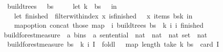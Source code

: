 \begin{isabellebody}
\ \ {\isachardoublequoteopen}build{\isacharunderscore}{\kern0pt}trees\ {\isasymG}\ {\isasymomega}\ bs\ {\isasymequiv}\isanewline
\ \ \ \ let\ k\ {\isacharequal}{\kern0pt}\ {\isacharbar}{\kern0pt}bs{\isacharbar}{\kern0pt}\ {\isacharminus}{\kern0pt}\ {}\ in\isanewline
\ \ \ \ let\ finished\ {\isacharequal}{\kern0pt}\ filter{\isacharunderscore}{\kern0pt}with{\isacharunderscore}{\kern0pt}index\ {\isacharparenleft}{\kern0pt}{\isasymlambda}x{\isachardot}{\kern0pt}\ is{\isacharunderscore}{\kern0pt}finished\ {\isasymG}\ {\isasymomega}\ x{\isacharparenright}{\kern0pt}\ {\isacharparenleft}{\kern0pt}items\ {\isacharparenleft}{\kern0pt}bs{\isacharbang}{\kern0pt}k{\isacharparenright}{\kern0pt}{\isacharparenright}{\kern0pt}\ in\isanewline
\ \ \ \ map{\isacharunderscore}{\kern0pt}option\ concat\ {\isacharparenleft}{\kern0pt}those\ {\isacharparenleft}{\kern0pt}map\ {\isacharparenleft}{\kern0pt}{\isasymlambda}{\isacharparenleft}{\kern0pt}{\isacharunderscore}{\kern0pt}{\isacharcomma}{\kern0pt}\ i{\isacharparenright}{\kern0pt}{\isachardot}{\kern0pt}\ build{\isacharunderscore}{\kern0pt}trees{\isacharprime}{\kern0pt}\ bs\ {\isasymomega}\ k\ i\ {\isacharbraceleft}{\kern0pt}i{\isacharbraceright}{\kern0pt}{\isacharparenright}{\kern0pt}\ finished{\isacharparenright}{\kern0pt}{\isacharparenright}{\kern0pt}{\isachardoublequoteclose}%
\isadelimdocument
%
\endisadelimdocument
%
\isatagdocument
%
\isamarkuptrue%
%
\endisatagdocument
{\isafolddocument}%
%
\isadelimdocument
%
\endisadelimdocument
{}\isamarkupfalse%
\ build{\isacharunderscore}{\kern0pt}forest{\isacharprime}{\kern0pt}{\isacharunderscore}{\kern0pt}measure\ {\isacharcolon}{\kern0pt}{\isacharcolon}{\kern0pt}\ {\isachardoublequoteopen}{\isacharparenleft}{\kern0pt}{\isacharprime}{\kern0pt}a\ bins\ {\isasymtimes}\ {\isacharprime}{\kern0pt}a\ sentential\ {\isasymtimes}\ nat\ {\isasymtimes}\ nat\ {\isasymtimes}\ nat\ set{\isacharparenright}{\kern0pt}\ {\isasymRightarrow}\ nat{\isachardoublequoteclose}\ \isanewline
\ \ {\isachardoublequoteopen}build{\isacharunderscore}{\kern0pt}forest{\isacharprime}{\kern0pt}{\isacharunderscore}{\kern0pt}measure\ {\isacharparenleft}{\kern0pt}bs{\isacharcomma}{\kern0pt}\ {\isasymomega}{\isacharcomma}{\kern0pt}\ k{\isacharcomma}{\kern0pt}\ i{\isacharcomma}{\kern0pt}\ I{\isacharparenright}{\kern0pt}\ {\isacharequal}{\kern0pt}\ foldl\ {\isacharparenleft}{\kern0pt}{\isacharplus}{\kern0pt}{\isacharparenright}{\kern0pt}\ {}\ {\isacharparenleft}{\kern0pt}map\ length\ {\isacharparenleft}{\kern0pt}take\ {\isacharparenleft}{\kern0pt}k{\isacharplus}{\kern0pt}{}{\isacharparenright}{\kern0pt}\ bs{\isacharparenright}{\kern0pt}{\isacharparenright}{\kern0pt}\ {\isacharminus}{\kern0pt}\ card\ I{\isachardoublequoteclose}\isanewline

\end{isabellebody}
